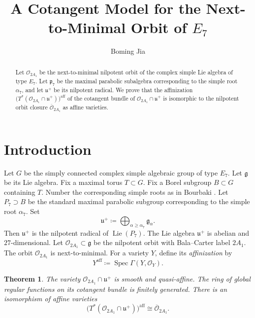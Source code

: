 \documentclass[12pt]{article}
\title{A Cotangent Model for the Next-to-Minimal Orbit of $E_7$}
\author{Boming Jia}
\date{}
\newtheorem{theorem}{Theorem}[section]
\theoremstyle{definition}
\DeclareMathOperator{\Spec}{Spec}
\begin{document}
\setlength{\droptitle}{-6em}
\maketitle
\vspace{-3.5em}

\begin{abstract}
Let \(\mathcal O_{2A_1}\) be the next-to-minimal nilpotent orbit of the
complex simple Lie algebra of type \(E_7\). Let \(\mathfrak p_7\) be the
maximal parabolic subalgebra corresponding to the simple root \(\alpha_7\),
and let \(\mathfrak u^+\) be its nilpotent radical. We prove that the
affinization \(\bigl(T^*(\mathcal O_{2A_1}\cap\mathfrak u^+)\bigr)^{\mathrm{aff}}\)
of the cotangent bundle of \(\mathcal O_{2A_1}\cap\mathfrak u^+\) is
isomorphic to the nilpotent orbit closure \(\overline{\mathcal O}_{2A_1}\)
as affine varieties.
\end{abstract}

\setlength{\abovedisplayskip}{10pt plus 2pt minus 5pt}
\setlength{\belowdisplayskip}{10pt plus 2pt minus 5pt}

\section{Introduction}

Let \(G\) be the simply connected complex simple algebraic group of type
\(E_7\). Let \(\mathfrak g\) be its Lie algebra. Fix a maximal torus
\(T\subset G\). Fix a Borel subgroup \(B\subset G\) containing \(T\).
Number the corresponding simple roots as in Bourbaki
\cite[Planche~VI]{Bourbaki}. Let \(P_7\supset B\) be the standard maximal
parabolic subgroup corresponding to the simple root \(\alpha_7\). Set
\[
    \mathfrak u^+
    \coloneqq
    \bigoplus_{\alpha\geq\alpha_7}\mathfrak g_\alpha.
\]
Then \(\mathfrak u^+\) is the nilpotent radical of
\(\operatorname{Lie}(P_7)\). The Lie algebra \(\mathfrak u^+\) is abelian
and \(27\)-dimensional. Let
\(\mathcal O_{2A_1}\subset\mathfrak g\) be the nilpotent orbit with
Bala--Carter label \(2A_1\). The orbit \(\mathcal O_{2A_1}\) is next-to-minimal.
For a variety \(Y\), define its \emph{affinization} by
\[
    Y^{\mathrm{aff}}\coloneqq\Spec\Gamma(Y,\mathcal O_Y).
\]

\begin{theorem}\label{main}
The variety \(\mathcal O_{2A_1}\cap\mathfrak u^+\) is smooth and quasi-affine.
The ring of global regular functions on its cotangent bundle is finitely
generated. There is an isomorphism of affine varieties
\[
    \bigl(T^*(\mathcal O_{2A_1}\cap\mathfrak u^+)\bigr)^{\mathrm{aff}}
    \cong\overline{\mathcal O}_{2A_1}.
\]
\end{theorem}
\end{document}
